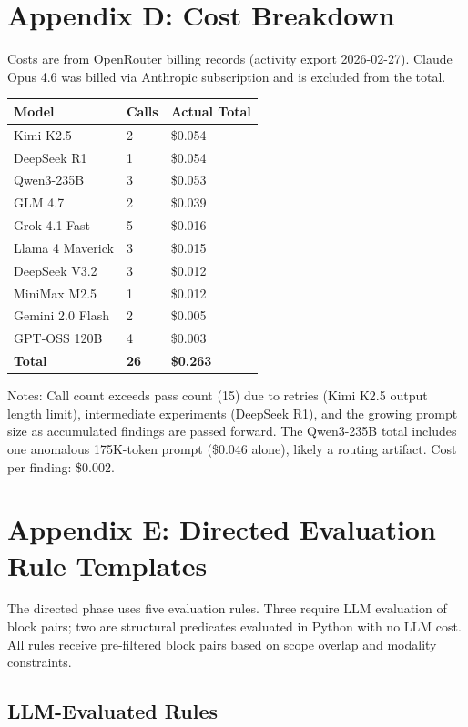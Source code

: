 \section{Appendix D: Cost Breakdown}

Costs are from OpenRouter billing records (activity export 2026-02-27).
Claude Opus 4.6 was billed via Anthropic subscription and is excluded
from the total.

\begin{table}[t]
\small
\begin{tabular}{@{}lll@{}}
\toprule
Model & Calls & Actual Total \\
\midrule
Kimi K2.5 & 2 & \$0.054 \\
DeepSeek R1 & 1 & \$0.054 \\
Qwen3-235B & 3 & \$0.053 \\
GLM 4.7 & 2 & \$0.039 \\
Grok 4.1 Fast & 5 & \$0.016 \\
Llama 4 Maverick & 3 & \$0.015 \\
DeepSeek V3.2 & 3 & \$0.012 \\
MiniMax M2.5 & 1 & \$0.012 \\
Gemini 2.0 Flash & 2 & \$0.005 \\
GPT-OSS 120B & 4 & \$0.003 \\
\textbf{Total} & \textbf{26} & \textbf{\$0.263} \\
\bottomrule
\end{tabular}
\end{table}

Notes: Call count exceeds pass count (15) due to retries (Kimi K2.5
output length limit), intermediate experiments (DeepSeek R1), and the
growing prompt size as accumulated findings are passed forward. The
Qwen3-235B total includes one anomalous 175K-token prompt (\$0.046
alone), likely a routing artifact. Cost per finding: \$0.002.

\section{Appendix E: Directed Evaluation Rule Templates}

The directed phase uses five evaluation rules. Three require LLM
evaluation of block pairs; two are structural predicates evaluated in
Python with no LLM cost. All rules receive pre-filtered block pairs
based on scope overlap and modality constraints.

\subsection{LLM-Evaluated Rules}


